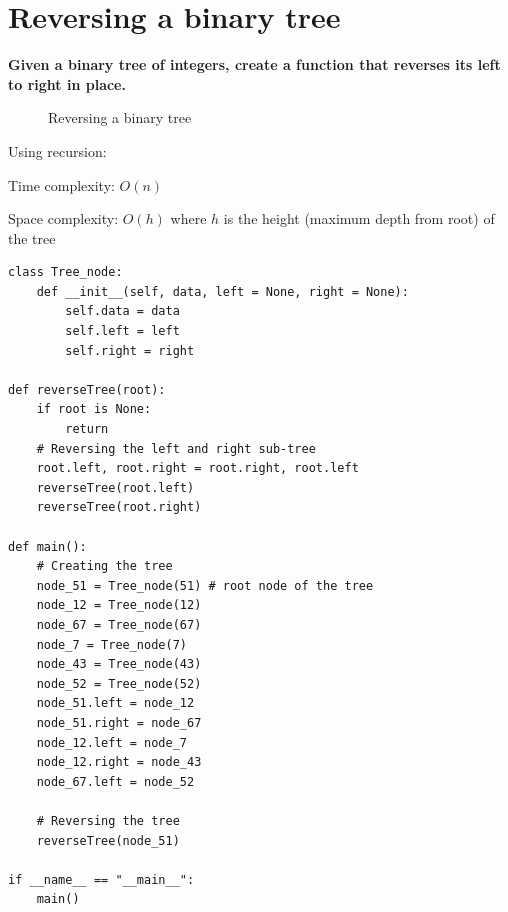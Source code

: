 \documentclass[a4paper,11pt]{book}
\begin{document}
\newpage
\section{Reversing a binary tree}

\textbf{Given a binary tree of integers, create a function that reverses its left to right in place.}
\vspace{5mm}
\begin{figure}[ht]
\begin{center}
\vspace{7mm}
\end{center}
\caption{Reversing a binary tree}
\end{figure}
\noindent Using recursion:

\noindent Time complexity: $O(n)$

\noindent Space complexity: $O(h)$ where $h$ is the height (maximum depth from root) of the tree

\begin{lstlisting}
class Tree_node:
    def __init__(self, data, left = None, right = None):
        self.data = data
        self.left = left
        self.right = right
    
def reverseTree(root):
	if root is None:
		return
	# Reversing the left and right sub-tree
	root.left, root.right = root.right, root.left
	reverseTree(root.left)
	reverseTree(root.right)
    
def main():
	# Creating the tree
	node_51 = Tree_node(51) # root node of the tree
	node_12 = Tree_node(12)
	node_67 = Tree_node(67)
	node_7 = Tree_node(7)
	node_43 = Tree_node(43)
	node_52 = Tree_node(52)
	node_51.left = node_12
	node_51.right = node_67
	node_12.left = node_7
	node_12.right = node_43
	node_67.left = node_52

	# Reversing the tree
	reverseTree(node_51)

if __name__ == "__main__":
	main()
\end{lstlisting}
\end{document}
